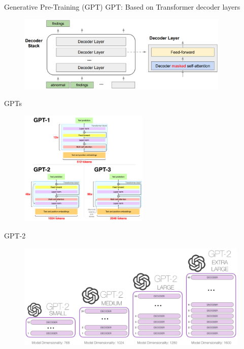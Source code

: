 \documentclass[serif, aspectratio=169]{beamer}
\begin{document}
\begin{frame}{Generative Pre-Training (GPT)}
    GPT: Based on Transformer decoder layers\\
    \hspace{1.50cm}
    \begin{figure}
        \centering
        \includegraphics[width=0.9\textwidth]{pic/decoder only.png}
        \caption{}
    \end{figure}
\end{frame}

\begin{frame}{GPTs}
    \hspace{2.90cm}
    \begin{figure}
        \centering
        \includegraphics[width=0.55\textwidth]{pic/GPTS.png}
        \caption{}
    \end{figure}
\end{frame}

\begin{frame}{GPT-2}
    \hspace{0.4cm}
    \begin{figure}
        \centering
        \includegraphics[width=0.99\textwidth]{pic/GPT-2.png}
        \caption{}
    \end{figure}
\end{frame}
\end{document}
